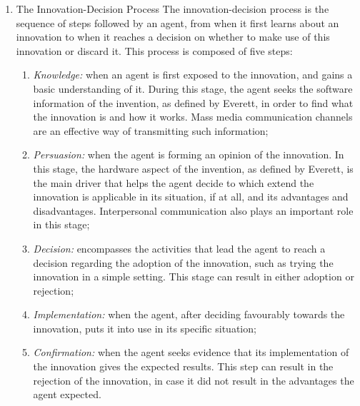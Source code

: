 \documentclass[12pt]{article}
\begin{document}
\begin{enumerate}
\item The Innovation-Decision Process
\label{sec:org1e6f627}
The innovation-decision process is the sequence of steps followed by an agent, from when it first learns about an innovation to when it reaches a decision on whether to make use of this innovation or discard it. This process is composed of five steps:

\begin{enumerate}
\item \emph{Knowledge:} when an agent is first exposed to the innovation, and gains a basic understanding of it. During this stage, the agent seeks the software information of the invention, as defined by Everett, in order to find what the innovation is and how it works. Mass media communication channels are an effective way of transmitting such information;
\item \emph{Persuasion:} when the agent is forming an opinion of the innovation. In this stage, the hardware aspect of the invention, as defined by Everett, is the main driver that helps the agent decide to which extend the innovation is applicable in its situation, if at all, and its advantages and disadvantages. Interpersonal communication also plays an important role in this stage;
\item \emph{Decision:} encompasses the activities that lead the agent to reach a decision regarding the adoption of the innovation, such as trying the innovation in a simple setting. This stage can result in either adoption or rejection;
\item \emph{Implementation:} when the agent, after deciding favourably towards the innovation, puts it into use in its specific situation;
\item \emph{Confirmation:} when the agent seeks evidence that its implementation of the innovation gives the expected results. This step can result in the rejection of the innovation, in case it did not result in the advantages the agent expected.
\end{enumerate}
\end{enumerate}
\end{document}
